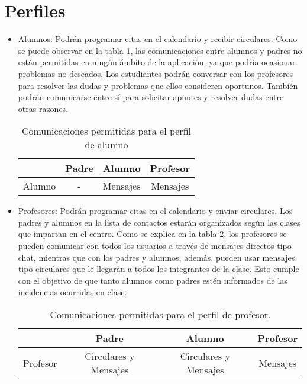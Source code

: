 	\section{Perfiles}
		\begin{itemize}
			\item Alumnos: Podrán programar citas en el calendario y recibir circulares. Como se puede observar en la tabla \ref{table:studentsCommunications}, las comunicaciones entre alumnos y padres no están permitidas en ningún ámbito de la aplicación, ya que podría ocasionar problemas no deseados.
			Los estudiantes podrán conversar con los profesores para resolver las dudas y problemas que ellos consideren oportunos. También podrán comunicarse entre sí para solicitar apuntes y resolver dudas entre otras razones.
			
			\begin{table} [!hbt]
				\begin{center}
					\begin{tabular}{|| c | c | c | c ||}
						\hline
						\hline
						& Padre & Alumno & Profesor \\
						\hline
						Alumno & - & Mensajes & Mensajes \\
						\hline
						\hline
					\end{tabular}
					\caption{Comunicaciones permitidas para el perfil de alumno}
					\label{table:studentsCommunications}
				\end{center}
			\end{table}
			
			\item Profesores: Podrán programar citas en el calendario y enviar circulares. Los padres y alumnos en la lista de contactos estarán organizados según las clases que impartan en el centro. Como se explica en la tabla \ref{table:teachersCommunications}, los profesores se pueden comunicar con todos los usuarios a través de mensajes directos tipo chat, mientras que con los padres y alumnos, además, pueden usar mensajes tipo circulares que le llegarán a todos los integrantes de la clase. Esto cumple con el objetivo de que tanto alumnos como padres estén informados de las incidencias ocurridas en clase.
			
			\begin{table} [!hbt]
				\begin{center}
					\begin{tabular}{|| c | c | c | c ||}
						\hline
						\hline
						& Padre & Alumno & Profesor \\
						\hline
						Profesor & Circulares y Mensajes & Circulares y Mensajes & Mensajes \\
						\hline
						\hline
					\end{tabular}
					\caption{Comunicaciones permitidas para el perfil de profesor.}
					\label{table:teachersCommunications}
				\end{center}
			\end{table}
			

\end{itemize}
